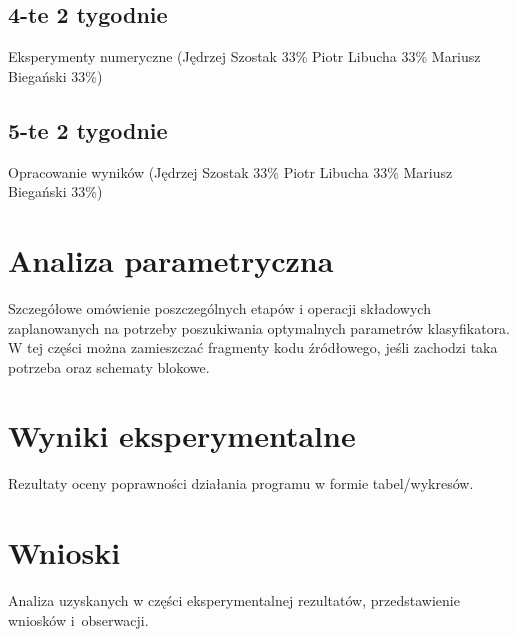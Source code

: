 \documentclass[paper=a4, fontsize=11pt]{scrartcl} %
\numberwithin{equation}{section} %
\numberwithin{figure}{section} %
\numberwithin{table}{section} %
\begin{document}
\subsection{4-te 2 tygodnie}
    Eksperymenty numeryczne (Jędrzej Szostak 33\% Piotr Libucha 33\% Mariusz Biegański 33\%)
\subsection{5-te 2 tygodnie}
    Opracowanie wyników (Jędrzej Szostak 33\% Piotr Libucha 33\% Mariusz Biegański 33\%)
\section{Analiza parametryczna}

	Szczegółowe omówienie poszczególnych etapów i operacji składowych zaplanowanych na potrzeby poszukiwania optymalnych parametrów klasyfikatora. W tej części można zamieszczać fragmenty kodu źródłowego, jeśli zachodzi taka potrzeba oraz schematy blokowe.
	
\section{Wyniki eksperymentalne}

	Rezultaty oceny poprawności działania programu w formie tabel/wykresów.

\section{Wnioski}

	Analiza uzyskanych w części eksperymentalnej rezultatów, przedstawienie wniosków i~obserwacji.
	
\end{document}
